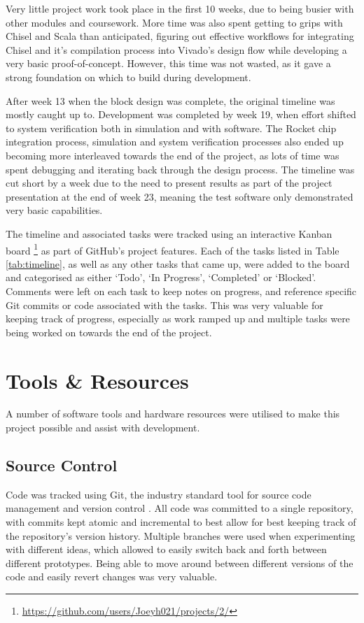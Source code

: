 Very little project work took place in the first 10 weeks, due to being busier with other modules and coursework. More time was also spent getting to grips with Chisel and Scala than anticipated, figuring out effective workflows for integrating Chisel and it's compilation process into Vivado's design flow while developing a very basic proof-of-concept. However, this time was not wasted, as it gave a strong foundation on which to build during development.

After week 13 when the block design was complete, the original timeline was mostly caught up to. Development was completed by week 19, when effort shifted to system verification both in simulation and with software. The Rocket chip integration process, simulation and system verification processes also ended up becoming more interleaved towards the end of the project, as lots of time was spent debugging and iterating back through the design process. The timeline was cut short by a week due to the need to present results as part of the project presentation at the end of week 23, meaning the test software only demonstrated very basic capabilities.

The timeline and associated tasks were tracked using an interactive Kanban board \footnote{\url{https://github.com/users/Joeyh021/projects/2/}} as part of GitHub's project features. Each of the tasks listed in Table \ref{tab:timeline}, as well as any other tasks that came up, were added to the board and categorised as either `Todo', `In Progress', `Completed' or `Blocked'. Comments were left on each task to keep notes on progress, and reference specific Git commits or code associated with the tasks. This was very valuable for keeping track of progress, especially as work ramped up and multiple tasks were being worked on towards the end of the project.



\section{Tools \& Resources}

A number of software tools and hardware resources were utilised to make this project possible and assist with development.

\subsection{Source Control}

Code was tracked using Git, the industry standard tool for source code management and version control \cite{git}. All code was committed to a single repository, with commits kept atomic and incremental to best allow for best keeping track of the repository's version history. Multiple branches were used when experimenting with different ideas, which allowed to easily switch back and forth between different prototypes. Being able to move around between different versions of the code and easily revert changes was very valuable.

